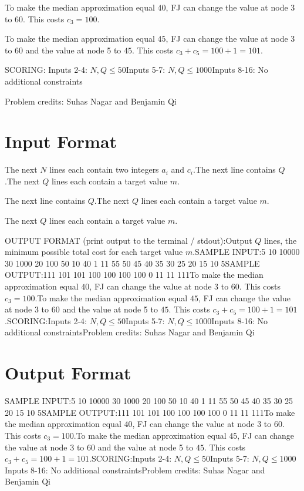 \documentclass[12pt]{article}
\begin{document}
To make the median approximation equal $40$, FJ can change the value at node 3
to $60$. This costs $c_3=100$.

To make the median approximation equal $45$, FJ can change the value at node 3
to $60$ and the value at node 5 to $45$. This costs $c_3+c_5=100+1=101$.

SCORING:
Inputs 2-4: $N,Q\le 50$Inputs 5-7: $N,Q\le 1000$Inputs 8-16: No additional constraints


Problem credits: Suhas Nagar and Benjamin Qi



\section*{Input Format}
The next $N$ lines each contain two integers $a_i$ and $c_i$.The next line contains $Q$.The next $Q$ lines each contain a target value $m$.

The next line contains $Q$.The next $Q$ lines each contain a target value $m$.

The next $Q$ lines each contain a target value $m$.

OUTPUT FORMAT (print output to the terminal / stdout):Output $Q$ lines, the minimum possible total cost for each target value $m$.SAMPLE INPUT:5
10 10000
30 1000
20 100
50 10
40 1
11
55
50
45
40
35
30
25
20
15
10
5SAMPLE OUTPUT:111
101
101
100
100
100
100
0
11
11
111To make the median approximation equal $40$, FJ can change the value at node 3
to $60$. This costs $c_3=100$.To make the median approximation equal $45$, FJ can change the value at node 3
to $60$ and the value at node 5 to $45$. This costs $c_3+c_5=100+1=101$.SCORING:Inputs 2-4: $N,Q\le 50$Inputs 5-7: $N,Q\le 1000$Inputs 8-16: No additional constraintsProblem credits: Suhas Nagar and Benjamin Qi

\section*{Output Format}
SAMPLE INPUT:5
10 10000
30 1000
20 100
50 10
40 1
11
55
50
45
40
35
30
25
20
15
10
5SAMPLE OUTPUT:111
101
101
100
100
100
100
0
11
11
111To make the median approximation equal $40$, FJ can change the value at node 3
to $60$. This costs $c_3=100$.To make the median approximation equal $45$, FJ can change the value at node 3
to $60$ and the value at node 5 to $45$. This costs $c_3+c_5=100+1=101$.SCORING:Inputs 2-4: $N,Q\le 50$Inputs 5-7: $N,Q\le 1000$Inputs 8-16: No additional constraintsProblem credits: Suhas Nagar and Benjamin Qi
\end{document}
